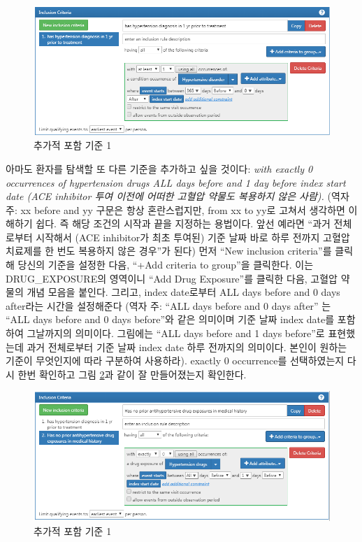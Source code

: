 \documentclass[10.5pt]{book}
\theoremstyle{definition}
\theoremstyle{definition}
\theoremstyle{definition}
\theoremstyle{remark}
\begin{document}
\begin{figure}

{\centering \includegraphics[width=1\linewidth]{images/Cohorts/ATLAS-IC1} 

}

\caption{추가적 포함 기준 1}\label{fig:ATLASIC1}
\end{figure}

아마도 환자를 탐색할 또 다른 기준을 추가하고 싶을 것이다: \emph{with
exactly 0 occurrences of hypertension drugs ALL days before and 1 day
before index start date (ACE inhibitor 투여 이전에 어떠한 고혈압 약물도
복용하지 않은 사람).} (역자주: xx before and yy 구문은 항상
혼란스럽지만, from xx to yy로 고쳐서 생각하면 이해하기 쉽다. 즉 해당
조건의 시작과 끝을 지정하는 용법이다. 앞선 예라면 ``과거 전체로부터
시작해서 (ACE inhibitor가 최초 투여된) 기준 날짜 바로 하루 전까지
고혈압치료제를 한 번도 복용하지 않은 경우''가 된다) 먼저 ``New inclusion
criteria''를 클릭해 당신의 기준을 설정한 다음, ``+Add criteria to
group''을 클릭한다. 이는 DRUG\_EXPOSURE의 영역이니 ``Add Drug
Exposure''를 클릭한 다음, 고혈압 약물의 개념 모음을 붙인다. 그리고,
index date로부터 ALL days before and 0 days after라는 시간을 설정해준다
(역자 주: ``ALL days before and 0 days after'' 는 ``ALL days before and
0 days before''와 같은 의미이며 기준 날짜 index date를 포함하여
그날까지의 의미이다. 그림에는 ``ALL days before and 1 days before''로
표현했는데 과거 전체로부터 기준 날짜 index date 하루 전까지의 의미이다.
본인이 원하는 기준이 무엇인지에 따라 구분하여 사용하라). exactly 0
occurrence를 선택하였는지 다시 한번 확인하고 그림 \ref{fig:ATLASIC2}과
같이 잘 만들어졌는지 확인한다.

\begin{figure}

{\centering \includegraphics[width=1\linewidth]{images/Cohorts/ATLAS-IC2} 

}

\caption{추가적 포함 기준 1}\label{fig:ATLASIC2}
\end{figure}
\end{document}
